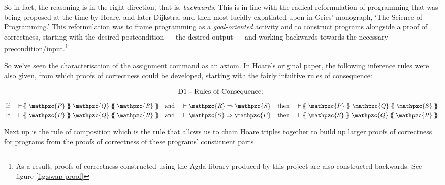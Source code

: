 \documentclass[oneside,12pt]{article}
\newcommand{\textM}[1]{\ensuremath{\mathpzc{#1}}}
\newcommand{\gtc}[3]{\!  \{\!\!\{ \; \textM{#1} \; \}\!\!\} \; \textM{#2} \;  \{\!\!\{ \; \textM{#3} \; \}\!\!\} \!}
\begin{document}
So in fact, the reasoning is in the right direction, that is, \emph{backwards}. This is in line with the radical reformulation of programming that was being proposed at the time by Hoare, and later Dijkstra, and then most lucidly expatiated upon in Gries' monograph\cite{Gries81}, `The Science of Programming.' This reformulation was to frame programming as a \emph{goal-oriented} activity and to construct programs alongside a proof of correctness, starting with the desired postcondition --- the desired output --- and working backwards towards the necessary precondition/input.\footnote{As a result, proofs of correctness constructed using the Agda library produced by this project are also constructed backwards. See figure \ref{fig:swap-proof}}



So we've seen the characterisation of the assignment command as an axiom. In Hoare's original paper, the following inference rules were also given, from which proofs of correctness could be developed, starting with the fairly intuitive rules of consequence:

  
\begin{equation}
  \label{eq:D1}
  \begin{array}{c}
    \mbox{D1 - Rules of Consequence: } \hspace*{\fill} \\
  \end{array}
\end{equation}  $
  \begin{array}{c}
    \hspace{\textwidth} \vspace{-1em} \\      
    \mbox{\!\!If\;\;\;\;} \vdash \gtc{P}{Q}{R} \mbox{\;\;\;\;and\;\;\;\;} \vdash \textM{R} \Rightarrow \textM{S} \mbox{\;\;\;\;then\;\;\;\;} \vdash \gtc{P}{Q}{S}\\[0.25em]
    \mbox{\!\!If\;\;\;\;} \vdash \gtc{P}{Q}{R} \mbox{\;\;\;\;and\;\;\;\;} \vdash \textM{S} \Rightarrow \textM{P} \mbox{\;\;\;\;then\;\;\;\;} \vdash \gtc{S}{Q}{R}
  \end{array}
  $

\vspace{2em}

Next up is the rule of composition which is the rule that allows us to chain Hoare triples together to build up larger proofs of correctness for programs from the proofs of correctness of these programs' constituent parts.
\end{document}
